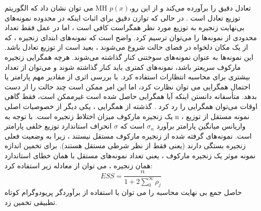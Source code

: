 می توان نشان داد که الگوریتم MH تعادل دقیق را برآورده می‌کند و از این رو،$p(x)$ توزیع تعادل است \cite{bishop2006pattern}. در حالی که توازن دقیق برای اثبات اینکه در محدوده نمونه‌های بی‌نهایت زنجیره به توزیع مورد نظر همگراست کافی است ، اما در عمل فقط تعداد محدودی از نمونه‌ها را می‌توان ترسیم کرد. واضح است که نمونه‌های ابتدای زنجیره ، که از یک مکان دلخواه در فضای حالت شروع می‌شوند ، بعید است از توزیع تعادل باشد. این نمونه‌ها به عنوان نمونه‌های سوختنی کنار گذاشته می‌شوند. هرچه همگرایی زنجیره مارکوف سریعتر باشد، نمونه‌های کمتری باید کنار گذاشته شوند و می‌توان از تعداد بیشتری برای محاسبه انتظارات استفاده کرد. با بررسی اثری از مقادیر مهم پارامتر یا احتمال همگرایی می توان نظارت کرد، اما این امر ممکن است چند حالت را از دست بدهد. متأسفانه دانستن اینکه آیا همگرایی حاصل شده است غیرممکن است، فقط گاهی اوقات می‌توان همگرایی را رد کرد \cite{gelman2011inference}. گذشته از همگرایی ، یکی دیگر از خصوصیات اصلی یک زنجیره مارکوف میزان اختلاط زنجیره است. با توجه به n نمونه مستقل از توزیع ، واریانس میانگین پارامتر برآورد $ \sigma_n $ است که $\sigma$ انحراف استاندارد توزیع خلفی پارامتر است. نمونه‌های گرفته شده از زنجیره مارکوف مستقل نیستند ، زیرا به وضعیت فعلی زنجیره بستگی دارند (یعنی فقط از نظر شرطی مستقل هستند). برای تخمین اندازه نمونه موثر یک زنجیره مارکوف ، یعنی تعداد نمونه‌های مستقل با همان خطای استاندارد همان زنجیره ، می توان از معادله زیر استفاده کرد:
\begin{equation}
	E S S=\frac{n}{1+2 \sum_{0}^{\infty} \rho_{j}}
\end{equation}
حاصل جمع بی نهایت محاسبه  را می توان با استفاده از برآوردگر پریودوگرام کوتاه تطبیقی  \cite{sokal1997monte} تخمین زد.